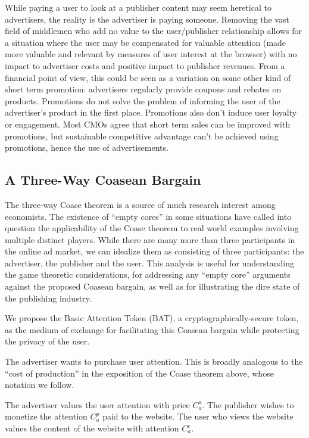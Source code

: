 \documentclass[11pt]{article}
\begin{document}
While paying a user to look at a publisher content may seem
heretical to advertisers, the reality is the advertiser is paying
someone. Removing the vast field of middlemen who add no
value to the user/publisher relationship allows for a situation where
the user may be compensated for valuable attention (made more
valuable and relevant by measures of user interest at the browser)
with no impact to advertiser costs and positive impact to publisher
revenues. From a financial point of view, this could be seen as a
variation on some other kind of short term promotion: advertisers
regularly provide coupons and rebates on products. Promotions do not
solve the problem of informing the user of the advertiser's product in
the first place. Promotions also don't induce user loyalty or
engagement. Most CMOs agree that short term sales can be improved with
promotions, but sustainable competitive advantage can't be achieved
using promotions, hence the use of advertisements. 

\subsection{A Three-Way Coasean Bargain}
\label{sec-8-2}

The three-way Coase theorem is a source of much research interest
among economists. The existence of ``empty cores'' in some situations
have called into question the applicability of the Coase theorem to
real world examples involving multiple distinct players\cite{20}. While there
are many more than three participants in the online ad market, we can
idealize them as consisting of three participants: the advertiser, the
publisher and the user. This analysis is useful for understanding the
game theoretic considerations, for addressing any ``empty core''
arguments against the proposed Coasean bargain, as well as for
illustrating the dire state of the publishing industry. 

We propose the Basic Attention Token (\textrm{BAT}), a cryptographically-secure
token, as the medium of exchange for facilitating this Coasean bargain
while protecting the privacy of the user.

The advertiser wants to purchase user attention. This is broadly
analogous to the ``cost of production'' in the exposition of the Coase
theorem above, whose notation we follow. 

The advertiser values the user attention with price $C^{a}_a$. The publisher wishes to 
monetize the attention $C^{p}_a$ paid to the website. The user who views the website 
values the content of the website with attention $C^{c}_a$.
\end{document}
